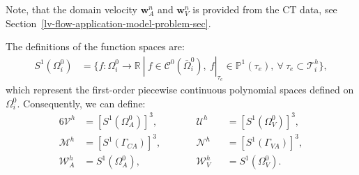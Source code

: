 \documentclass[3p]{elsarticle}
\begin{document}
Note, that the domain velocity $\boldsymbol{w}_A^n$ and $\boldsymbol{w}_V^n$
is provided from the CT data, see Section~\ref{lv-flow-application-model-problem-sec}.

The definitions of the function spaces are:
\begin{align}
	S^1 \left( \Omega^0_i \right) &= \{f:\Omega^0_i \rightarrow \mathbb{R}~|~
	f\in\mathcal{C}^0(\bar{\Omega}^0_i),~
	f|_{\tau_e} \in \mathbb{P}^1 (\tau_e),~\forall~\tau_e \subset \mathcal{T}^h_i \},
\end{align}
which represent the first-order piecewise continuous polynomial spaces
defined on $\Omega^0_i$. Consequently, we can define:
\begin{alignat*}{6}
	\boldsymbol{\mathcal{V}}^h &=  \left[S^1 ( \Omega^0_A )\right]^3, &\qquad&
	\boldsymbol{\mathcal{U}}^h &&= \left[S^1 ( \Omega^0_V )\right]^3, \\
	\boldsymbol{\mathcal{M}}^h &=  \left[S^1 (\Gamma_{CA} ) \right]^3, &\qquad&
	\boldsymbol{\mathcal{N}}^h &&= \left[S^1 (\Gamma_{VA} ) \right]^3, \\
	\mathcal{W}_A^h            &=  S^1 ( \Omega^0_A ), &\qquad&
	\mathcal{W}_V^h            &&= S^1 ( \Omega^0_V ).
\end{alignat*}
\end{document}
